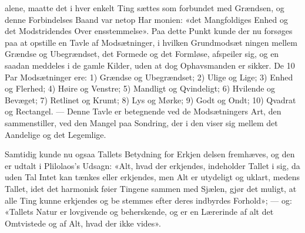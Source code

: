 \documentclass[12pt,a4paper]{book}
\begin{document}
alene, maatte det i hver enkelt Ting sættes som forbundet
med Grændsen, og denne Forbindelses Baand var netop Har\-%
monien: «det Mangfoldiges Enhed og det Modstridendes Over\-%
ensstemmelse». Paa dette Punkt kunde der nu forsøges paa
at opstille en Tavle af Modsætninger, i hvilken Grundmodsæt\-%
ningen mellem Grændse og Ubegrændset, det Formede og det
Formløse, afspeiler sig, og en saadan meddeles i de gamle
Kilder, uden at dog Ophavsmanden er sikker. De 10 Par
Modsætninger ere: 1) Grændse og Ubegrændset; 2) Ulige og
Lige; 3) Enhed og Flerhed; 4) Høire og Venstre; 5) Mandligt
og Qvindeligt; 6) Hvilende og Bevæget; 7) Retlinet og Krumt;
8) Lys og Mørke; 9) Godt og Ondt; 10) Qvadrat og Rectangel.
--- Denne Tavle er betegnende ved de Modsætningers Art, den
sammenstiller, ved den Mangel paa Sondring, der i den viser
sig mellem det Aandelige og det Legemlige.

Samtidig kunde nu ogsaa Tallets Betydning for Erkjen\-%
delsen fremhæves, og den er udtalt i Plilolaos's Udsagn: «Alt,
hvad der erkjendes, indeholder Tallet i sig, da uden Tal Intet
kan tænkes eller erkjendes, men Alt er utydeligt og uklart,
medens Tallet, idet det harmonisk føier Tingene sammen med
Sjælen, gjør det muligt, at alle Ting kunne erkjendes og be\-%
stemmes efter deres indbyrdes Forhold»; --- og: «Tallets Natur
er lovgivende og beherskende, og er en Lærerinde af alt det
Omtvistede og af Alt, hvad der ikke vides».
\end{document}
